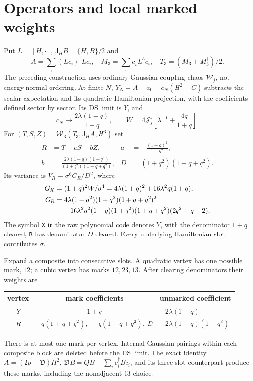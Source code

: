 \documentclass[11pt,a4paper]{article}
\newcommand{\Js}{\mathcal J_s}
\newcommand{\W}{\mathcal W}
\newcommand{\DD}{\mathfrak D}
\newcommand{\sig}{\sigma}
\begin{document}
\section{Operators and local marked weights}
Put $L=[H,\cdot]$, $\mathsf J_H B=\{H,B\}/2$ and
\[
 A=\sum_i(Lc_i)^\dagger Lc_i,\quad
 M_3=\sum_i c_i^\dagger L^3c_i,\quad T_3=(M_3+M_3^\dagger)/2.
\]
The preceding construction \cite{local} uses ordinary Gaussian coupling
chaos $\W_j$, not energy normal ordering. At finite $N$,
$Y_N=A-a_0-c_N(H^2-C)$ subtracts the scalar expectation and its quadratic
Hamiltonian projection, with the coefficients defined sector by sector.
Its DS limit is $Y$, and
\[
 c_N\longrightarrow\frac{2\lambda(1-q)}{1+q},\qquad
 W=4\Js^4\left[\lambda^{-1}+\frac{4q}{1+q}\right].
\]
For $(T,S,Z)=\W_3(T_3,\mathsf J_H A,H^3)$ set
\begin{align}
 R&=T-aS-bZ,&a&=-\frac{(1-q)^2}{1+q^2},\\
 b&=\frac{2\lambda(1-q)(1+q^3)}{(1+q^2)(1+q+q^2)},&
 D&=(1+q^2)(1+q+q^2).
\end{align}
Its variance is $V_R=\sig^6G_R/D^2$, where
\begin{align}
 G_X&=(1+q)^2W/\sig^4=4\lambda(1+q)^2+16\lambda^2q(1+q),\\
 G_R&=4\lambda(1-q^2)(1+q^2)(1+q+q^2)^2\notag\\
 &\quad+16\lambda^2q^2(1+q)(1+q^2)(1+q+q^2)(2q^2-q+2).
\end{align}
The symbol \texttt{X} in the raw polynomial code denotes $Y$, with the
denominator $1+q$ cleared; \texttt{R} has denominator $D$ cleared.
Every underlying Hamiltonian slot contributes $\sig$.

Expand a composite into consecutive slots. A quadratic vertex has one
possible mark, $12$; a cubic vertex has marks $12,23,13$. After clearing
denominators their weights are
\begin{center}
\begin{tabular}{ccl}
\toprule
vertex&mark coefficients&unmarked coefficient\\\midrule
$Y$&$1+q$&$-2\lambda(1-q)$\\
$R$&$-q(1+q+q^2),\ -q(1+q+q^2),\ D$&$-2\lambda(1-q)(1+q^3)$\\
\bottomrule
\end{tabular}
\end{center}
There is at most one mark per vertex. Internal Gaussian pairings within
each composite block are deleted before the DS limit. The exact identity
$A=(2p-\DD)H^2$, $\DD B=QB-\sum_i c_i^\dagger Bc_i$, and its three-slot
counterpart produce these marks, including the nonadjacent $13$ choice.
\end{document}
